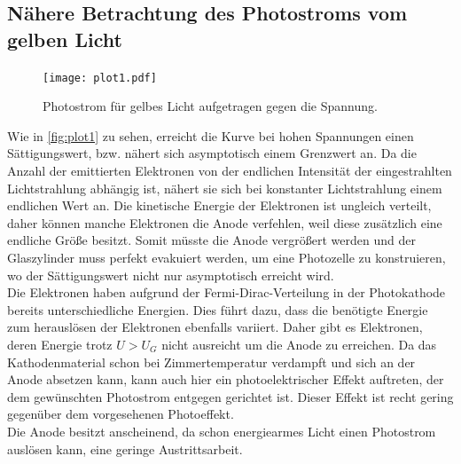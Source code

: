 
\subsection{Nähere Betrachtung des Photostroms vom gelben Licht} %
\label{sub:Nähere Betrachtung des Photostroms vom gelben Licht}

\begin{figure}[H]
  \centering
  \texttt{[image: plot1.pdf]}
  \caption{Photostrom für gelbes Licht aufgetragen gegen die Spannung.}
  \label{fig:plot1}
\end{figure}

Wie in \autoref{fig:plot1} zu sehen, erreicht die Kurve bei hohen Spannungen einen Sättigungswert, bzw. nähert sich asymptotisch einem Grenzwert an.
Da die Anzahl der emittierten Elektronen von der endlichen Intensität der eingestrahlten Lichtstrahlung abhängig ist,
nähert sie sich bei konstanter Lichtstrahlung einem endlichen Wert an.
Die kinetische Energie der Elektronen ist ungleich verteilt, daher können manche Elektronen die Anode verfehlen,
weil diese zusätzlich eine endliche Größe besitzt. Somit müsste die Anode vergrößert werden und der Glaszylinder muss perfekt
evakuiert werden, um eine Photozelle zu konstruieren, wo der Sättigungswert nicht nur asymptotisch erreicht wird.\\
Die Elektronen haben aufgrund der Fermi-Dirac-Verteilung in der Photokathode bereits unterschiedliche Energien.
Dies führt dazu, dass die benötigte Energie zum herauslösen der Elektronen ebenfalls variiert.
Daher gibt es Elektronen, deren Energie trotz $U > U_G$ nicht ausreicht um die Anode zu erreichen.
Da das Kathodenmaterial schon bei Zimmertemperatur verdampft\cite{V500} und sich an der Anode absetzen kann,
kann auch hier ein photoelektrischer Effekt auftreten, der dem gewünschten Photostrom entgegen gerichtet ist.
Dieser Effekt ist recht gering gegenüber dem vorgesehenen Photoeffekt.\\
Die Anode besitzt anscheinend, da schon energiearmes Licht einen Photostrom auslösen kann, eine geringe Austrittsarbeit.


